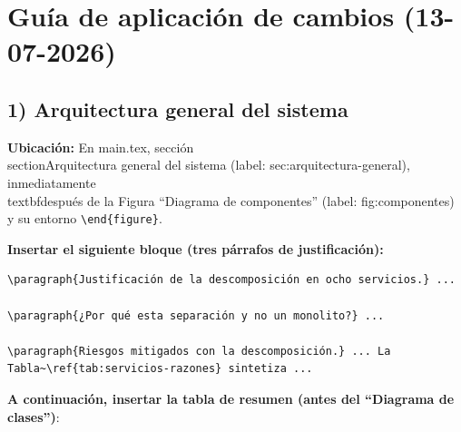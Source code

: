 
\section*{Guía de aplicación de cambios (13-07-2026)}

\subsection*{1) Arquitectura general del sistema}

\textbf{Ubicación:} En main.tex, sección \\section{Arquitectura general del sistema} (label: sec:arquitectura-general), inmediatamente \\textbf{después} de la Figura ``Diagrama de componentes'' (label: fig:componentes) y su entorno \verb|\end{figure}|.

\textbf{Insertar el siguiente bloque (tres párrafos de justificación):}

\begin{verbatim}
\paragraph{Justificación de la descomposición en ocho servicios.} ...

\paragraph{¿Por qué esta separación y no un monolito?} ...

\paragraph{Riesgos mitigados con la descomposición.} ... La Tabla~\ref{tab:servicios-razones} sintetiza ...
\end{verbatim}

\textbf{A continuación, insertar la tabla de resumen (antes del ``Diagrama de clases'')}: 

